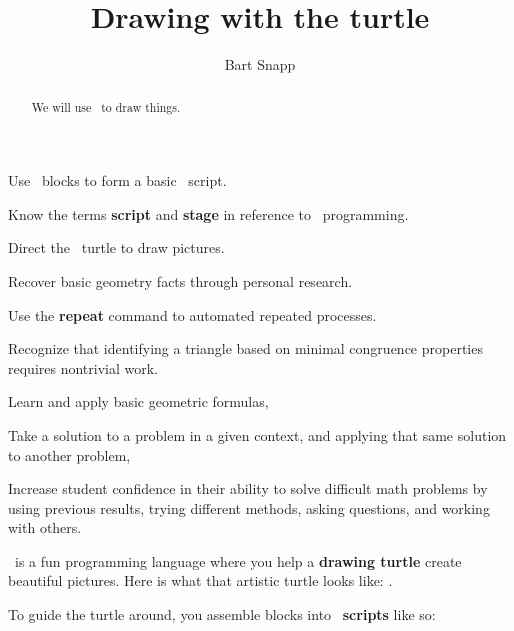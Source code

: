 \documentclass[handout,noauthor,nooutcomes]{../ximera}
\title{Drawing with the turtle}
\author{Bart Snapp}
\begin{document}
\begin{abstract}
  We will use \snap\ to draw things.
\end{abstract}
\maketitle

\begin{listOutcomes}
\item{Use \snap\ blocks to form a basic \snap\ script.}
\item{Know the terms \textbf{script} and \textbf{stage} in reference to \snap\ programming.}
\item{Direct the \snap\ turtle to draw pictures.}
\item{Recover basic geometry facts through personal research.}
\item{Use the \textbf{repeat} command to automated repeated processes.}
\item{Recognize that identifying a triangle based on minimal
  congruence properties requires nontrivial work.}
\end{listOutcomes}

\begin{listObjectives}
 \item Learn and apply basic geometric formulas,
 \item Take a solution to a problem in a given context, and applying that same solution to another problem,
\item Increase student confidence in their ability to solve difficult math problems by using previous results, trying different methods, asking questions, and working with others.
\end{listObjectives}

\snap\ is a fun programming language where you help a \textbf{drawing
  turtle} create beautiful pictures.  Here is what that artistic
turtle looks like:
.


To guide the turtle around, you assemble blocks into
\snap\ \textbf{scripts} like so:
\end{document}

